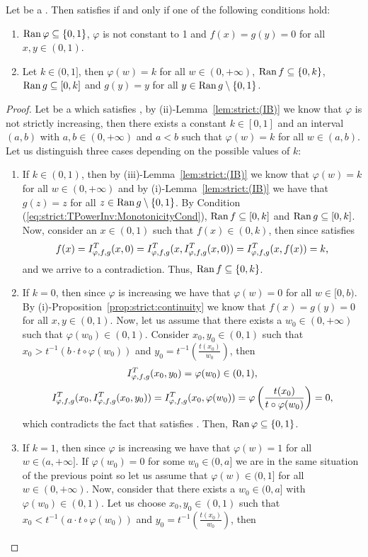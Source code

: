 \begin{proposition}\label{prop:strict:(IB)} Let \IT be a \STP. Then \IT satisfies \IB if and only if one of the following conditions hold:
	\begin{enumerate}[label=(\roman*)]
		\item $\operatorname{Ran} \varphi  \subseteq \{0,1\}$, $\varphi$ is not constant to 1 and $f(x)=g(y)=0$ for all $x,y \in (0,1)$.
		\item Let $k \in (0,1]$, then $\varphi(w)=k$ for all $w \in (0,+\infty)$, $\operatorname{Ran} f \subseteq \{0,k\}$, $\operatorname{Ran} g \subseteq [0,k]$ and $g(y)=y$ for all $y \in \operatorname{Ran} g \setminus \{0,1\}$.
	\end{enumerate}
\end{proposition}
\begin{proof}
	Let \IT be a \STP which satisfies \IB, by {(ii)-Lemma~\ref{lem:strict:(IB)}} we know that $\varphi$ is not strictly increasing, then there exists a constant $k\in [0,1]$ and an interval $(a,b)$ with $a,b \in (0,+\infty)$ and $a<b$ such that $\varphi(w)=k$ for all $w\in (a,b)$. Let us distinguish three cases depending on the possible values of $k$:
	\begin{enumerate}
		\item If $k \in (0,1)$, then by {(iii)-Lemma~\ref{lem:strict:(IB)}} we know that $\varphi(w)=k$ for all $w \in (0,+\infty)$ and by {(i)-Lemma~\ref{lem:strict:(IB)}} we have that $g(z)=z$ for all $z \in \operatorname{Ran} g \setminus \{0,1\}$. By Condition (\ref{eq:strict:TPowerInv:MonotonicityCond}), $\operatorname{Ran} f \subseteq [0,k]$ and $\operatorname{Ran} g \subseteq [0,k]$. Now, consider an $x \in (0,1)$ such that $f(x) \in (0,k)$, then since \IT satisfies \IB
		$$f(x)=I^T_{\varphi,f,g}(x,0)=I^T_{\varphi,f,g}(x,I^T_{\varphi,f,g}(x,0))=I^T_{\varphi,f,g}(x,f(x))=k,$$
		and we arrive to a contradiction. Thus, $\operatorname{Ran} f \subseteq \{0,k\}$.
		\item If $k=0$, then since $\varphi$ is increasing we have that $\varphi(w)=0$ for all $ w\in [0,b)$. By {(i)-Proposition~\ref{prop:strict:continuity}} we know that $f(x)=g(y)=0$ for all $x,y \in (0,1)$. Now, let us assume that there exists a $w_0 \in (0,+\infty)$ such that $\varphi(w_0) \in (0,1)$. Consider $x_0,y_0 \in (0,1)$ such that $x_0 > t^{-1}(b\cdot t \circ \varphi (w_0))$ and $y_0=t^{-1}\left(\frac{t(x_0)}{w_0}\right)$, then
		$$I^T_{\varphi,f,g}(x_0,y_0)=\varphi(w_0) \in (0,1),$$
		$$I^T_{\varphi,f,g}(x_0,I^T_{\varphi,f,g}(x_0,y_0))=I^T_{\varphi,f,g}(x_0,\varphi(w_0))=\varphi \left(\frac{t(x_0)}{t \circ \varphi(w_0)}\right)=0,$$
		which contradicts the fact that \IT satisfies \IB. Then, $\operatorname{Ran} \varphi \subseteq \{0,1\}$.
		\item If $k = 1$, then since $\varphi$ is increasing we have that $\varphi(w)=1$ for all $w \in (a,+\infty]$. If $\varphi(w_0)=0$ for some $w_0 \in(0,a]$ we are in the same situation of the previous point so let us assume that $\varphi(w) \in (0,1]$ for all $w \in (0,+\infty)$. Now, consider that there exists a $w_0 \in (0,a]$ with $\varphi(w_0) \in (0,1)$. Let us choose $x_0,y_0 \in (0,1)$ such that $x_0 < t^{-1}(a\cdot t \circ \varphi (w_0))$ and $y_0=t^{-1} \left(\frac{t(x_0)}{w_0}\right)$, then

\end{enumerate}
\end{proof}
